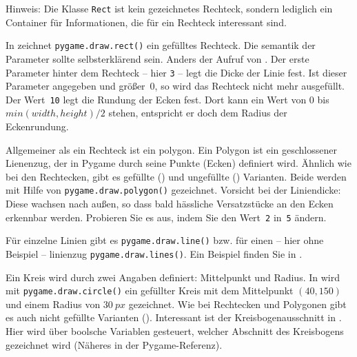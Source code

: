 Hinweis: Die Klasse \texttt{Rect} ist kein gezeichnetes Rechteck, sondern lediglich ein Container für Informationen, die für ein Rechteck interessant sind. 

In  zeichnet \texttt{pygame.draw.rect()} ein gefülltes Rechteck. Die \Gls{semantik} der Parameter sollte selbsterklärend sein. Anders der Aufruf von . Der erste Parameter hinter dem Rechteck -- hier \texttt{3} -- legt die Dicke der Linie fest. Ist dieser Parameter angegeben und größer~0, so wird das Rechteck nicht mehr ausgefüllt. Der Wert~\texttt{10} legt die Rundung der Ecken fest. Dort kann ein Wert von 0 bis $min(width, height)/2$ stehen, entspricht er doch dem Radius der Eckenrundung.

Allgemeiner als ein Rechteck ist ein \Gls{polygon}. Ein Polygon ist ein geschlossener Lienenzug, der in Pygame durch seine Punkte (Ecken) definiert wird. Ähnlich wie bei den Rechtecken, gibt es gefüllte () und ungefüllte () Varianten. Beide werden mit Hilfe von \texttt{pygame.draw.polygon()} gezeichnet. Vorsicht bei der Liniendicke: Diese wachsen nach außen, so dass bald hässliche Versatzstücke an den Ecken erkennbar werden. Probieren Sie es aus, indem Sie den Wert~\texttt{2} in~\texttt{5} ändern.

Für einzelne Linien gibt es \texttt{pygame.draw.line()} bzw. für einen -- hier ohne Beispiel -- \gls{linienzug} \texttt{pygame.draw.lines()}. Ein Beispiel finden Sie in .

Ein Kreis wird durch zwei Angaben definiert: Mittelpunkt und Radius. In  wird mit \texttt{pygame.draw.circle()} ein gefüllter Kreis mit dem Mittelpunkt $(40, 150)$ und einem Radius von $30~px$ gezeichnet. Wie bei Rechtecken und Polygonen gibt es auch nicht gefüllte Varianten (). Interessant ist der Kreisbogenausschnitt in . Hier wird über boolsche Variablen gesteuert, welcher Abschnitt des Kreisbogens gezeichnet wird (Näheres in der Pygame-Referenz).

